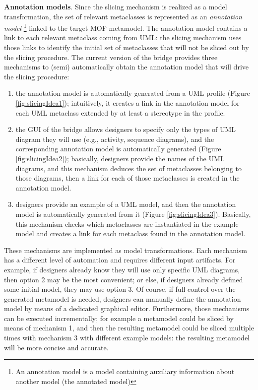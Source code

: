 \textbf{Annotation models}. Since the slicing mechanism is realized as a model transformation, the set of relevant metaclasses is represented as an \textit{annotation model}
\footnote{An annotation model is a model containing auxiliary information about another model (the annotated model)\cite{MCDFthesis}} linked to the target MOF metamodel.
The annotation model contains a link to each relevant metaclass coming from UML: the slicing mechanism uses those links to identify the initial set of metaclasses that will not be sliced out by the slicing procedure.
The current version of the bridge provides three mechanisms to (semi) automatically obtain the annotation model that will drive the slicing procedure:
%
\begin{enumerate}
	\item the annotation model is automatically generated from a UML profile (Figure \ref{fig:slicingIdea1}); intuitively, it creates a link in the annotation model
	for each UML metaclass extended by at least a stereotype in the profile.
	\item the GUI of the bridge allows designers to specify only the types of UML diagram they will use (e.g., activity, sequence diagrams), and the corresponding annotation model
	is automatically generated (Figure \ref{fig:slicingIdea2}); basically, designers provide the names of the UML diagrams, and this mechanism deduces the set of metaclasses belonging to those diagrams, then a link for each of those metaclasses is created in the annotation model.
	\item designers provide an example of a UML model, and then the annotation model is automatically generated from it (Figure \ref{fig:slicingIdea3}).
	Basically, this mechanism checks which metaclasses are instantiated in the example model and creates a link for each metaclass found in the annotation model.
\end{enumerate}
%
These mechanisms are implemented as model transformations. Each mechanism has a different level of automation and requires different input artifacts. For example, if designers already know they will use only specific UML diagrams, then option 2 may be the most convenient;
or else, if designers already defined some initial model, they may use option 3.
Of course, if full control over the generated metamodel is needed, designers can manually define the annotation model by means of a dedicated graphical editor.
Furthermore, those mechanisms can be executed incrementally; for example a metamodel could be sliced by means of
mechanism 1, and then the resulting metamodel could be sliced multiple times with mechanism 3 with different example models:
the resulting metamodel will be more concise and accurate.

